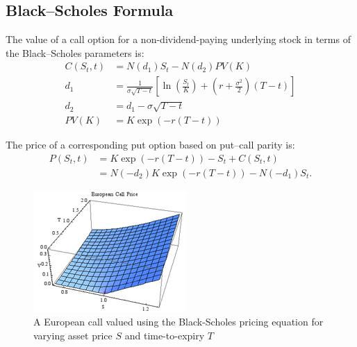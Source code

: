 \subsection{Black–Scholes Formula}
The value of a call option for a non-dividend-paying underlying stock in terms of the Black–Scholes parameters is:
\begin{equation}\label{F:black-scholes-2}
    \begin{aligned}
        C(S_t,t) &= N(d_1)S_t - N(d_2)PV(K) \\
        d_1 &= \frac{1}{\sigma\sqrt{T-t}}\left[\ln\left(\frac{S_t}{K}\right)+\left(r+\frac{\sigma^2}{2}\right)(T-t)\right] \\
        d_2 &= d_1 - \sigma\sqrt{T-t} \\
        PV(K) &= K\exp{(-r(T-t))}
    \end{aligned}
\end{equation}

The price of a corresponding put option based on put–call parity is:
\begin{equation}\label{F:black-scholes-3}
    \begin{aligned}
        P(S_t,t) &= K\exp{(-r(T-t))} - S_t + C(S_t,t) \\
        &= N(-d_2)K\exp{(-r(T-t))} - N(-d_1)S_t.
    \end{aligned}
\end{equation}
\begin{figure}[H]
    \centering
    \includegraphics[width=.5\textwidth]{figures/2019-11-13-black-scholes-6}
    \caption{A European call valued using the Black-Scholes pricing equation for varying asset price $S$ and time-to-expiry $T$}\label{F:black-scholes-6}
\end{figure}




